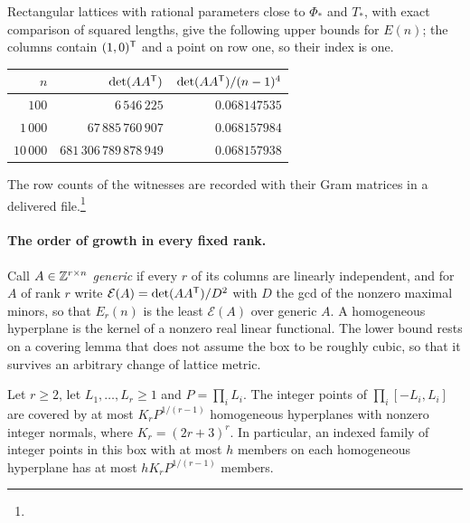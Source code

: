 \begin{example}\label{src:ex:gramwitness}
Rectangular lattices with rational parameters close to $\Phi_*$ and $T_*$, with exact comparison of squared
lengths, give the following upper bounds for $E(n)$; the columns contain $(1,0)^{\mathsf{T}}$ and a point on row
one, so their index is one.
\begin{center}\small
\begin{tabular}{rrr}
\toprule
$n$ & $\det(AA^{\mathsf{T}})$ & $\det(AA^{\mathsf{T}})/(n-1)^4$\\
\midrule
$100$ & $6\,546\,225$ & $0.068147535$\\
$1\,000$ & $67\,885\,760\,907$ & $0.068157984$\\
$10\,000$ & $681\,306\,789\,878\,949$ & $0.068157938$\\
\bottomrule
\end{tabular}
\end{center}
The row counts of the witnesses are recorded with their Gram matrices in a delivered
file.\footnote{\raggedright{}}
\end{example}

\paragraph{The order of growth in every fixed rank.} Call $A\in\mathbb{Z}^{r\times n}$ \emph{generic} if every $r$
of its columns are linearly independent, and for $A$ of rank $r$ write $\mathcal E(A)=\det(AA^{\mathsf{T}})/D^2$
with $D$ the gcd of the nonzero maximal minors, so that $E_r(n)$ is the least $\mathcal E(A)$ over generic
$A$. A homogeneous hyperplane is the kernel of a nonzero real linear functional. The lower bound rests on a
covering lemma that does not assume the box to be roughly cubic, so that it survives an arbitrary change of
lattice metric.

\begin{lemma}\label{spn:lem:gramcover}
Let $r\ge2$, let $L_1,\dots,L_r\ge1$ and $P=\prod_iL_i$. The integer points of $\prod_i[-L_i,L_i]$ are covered
by at most $K_rP^{1/(r-1)}$ homogeneous hyperplanes with nonzero integer normals, where $K_r=(2r+3)^r$. In
particular, an indexed family of integer points in this box with at most $h$ members on each homogeneous
hyperplane has at most $hK_rP^{1/(r-1)}$ members.
\end{lemma}

